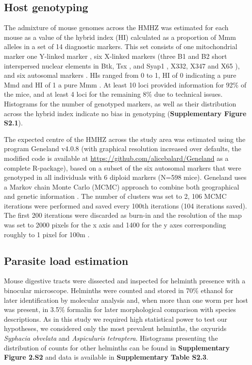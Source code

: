 \subsection{Host genotyping}
The admixture of mouse genomes across the HMHZ was estimated for each mouse as a value of the hybrid index (HI) calculated as a proportion of Mmm alleles in a set of 14 diagnostic markers. This set consists of one mitochondrial marker \parencite[BamHI, a restriction site in the Nd1 gene;][]{bozikova_mitochondrial_2005, munclinger_genetic_2002} one Y-linked marker \parencite[presence/absence of a short insertion in the Zfy2 gene;][]{boissinot_discordant_1997, nagamine_musculus-type_1992}, six X-linked markers (three B1 and B2 short interspersed nuclear elements in Btk, Tsx \citep{munclinger_b1_2003}, and Syap1 \citep{macholan_genetic_2007}, X332, X347 and X65 \citep{dufkova_inference_2011, dureje_mouse_2012}), and six autosomal markers \parencite[Es1, H6pd, Idh1, Mpi, Np, Sod1;][]{macholan_genetic_2007}. HIs ranged from 0 to 1, HI of 0 indicating a pure Mmd and HI of 1 a pure Mmm \citep{baird_what_2012, macholan_genetic_2007}. At least 10 loci provided information for 92\% of the mice, and at least 4 loci for the remaining 8\% due to technical issues. Histograms for the number of genotyped markers, as well as their distribution across the hybrid index indicate no bias in genotyping (\textbf{Supplementary Figure S2.1}). 
\par The expected centre of the HMHZ across the study area was estimated using the program Geneland v4.0.8 (with graphical resolution increased over defaults, the modified code is available at \url{https://github.com/alicebalard/Geneland} as a complete R-package), based on a subset of the six autosomal markers that were genotyped in all individuals with 6 diploid markers (N=598 mice). Geneland uses a Markov chain Monte Carlo (MCMC) approach to combine both geographical and genetic information \citep{guillot_geneland_2005}. The number of clusters was set to 2, 106 MCMC iterations were performed and saved every 100th iterations (104 iterations saved). The first 200 iterations were discarded as burn-in and the resolution of the map was set to 2000 pixels for the x axis and 1400 for the y axes corresponding roughly to 1 pixel for 100m \citep{macholan_assessing_2011}.

\subsection{Parasite load estimation}
Mouse digestive tracts were dissected and inspected for helminth presence with a binocular microscope. Helminths were counted and stored in 70\% ethanol for later identification by molecular analysis and, when more than one worm per host was present, in 3.5\% formalin for later morphological comparison with species descriptions. As in this study we required high statistical power to test our hypotheses, we considered only the most prevalent helminths, the oxyurids \textit{Syphacia obvelata} and \textit{Aspiculuris tetraptera}. Histograms presenting the distribution of  counts for other helminths can be found in \textbf{Supplementary Figure 2.S2} and data is available in \textbf{Supplementary Table S2.3}.

